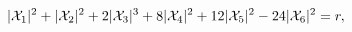 \begin{equation}
\label{eq:Dterm}
|{\cal X}_1|^2+|{\cal X}_2|^2+2|{\cal X}_3|^3+8|{\cal X}_4|^2+12|{\cal X}_5|^2
-24|{\cal X}_6|^2=r,
\end{equation}

